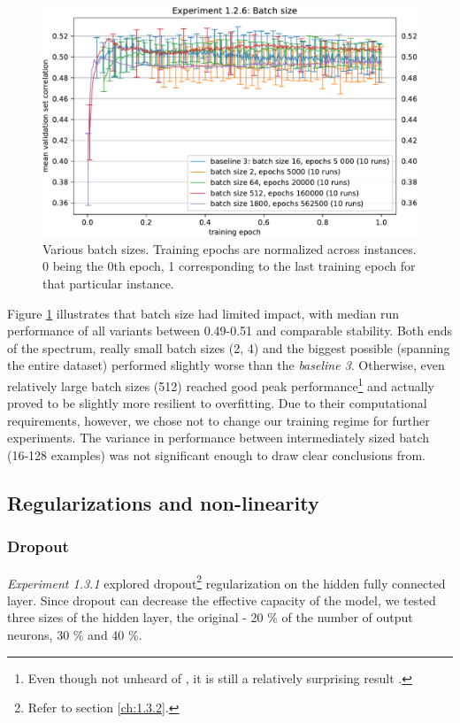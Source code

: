 \begin{figure}[H]
    \centering
    \includegraphics[width=1\textwidth]{../figures/05_1_2_6}
    \caption[Experiment 1.2.6]{Various batch sizes. Training epochs are normalized across instances. 0 being the 0th epoch, 1 corresponding to the last training epoch for that particular instance.}
    \label{fig:5.1.2.6}
\end{figure}

Figure \ref{fig:5.1.2.6} illustrates that batch size had limited impact, with median run performance of all variants between 0.49-0.51 and comparable stability. Both ends of the spectrum, really small batch sizes (2, 4) and the biggest possible (spanning the entire dataset) performed slightly worse than the \textit{baseline 3}. Otherwise, even relatively large batch sizes (512) reached good peak performance\footnote{Even though not unheard of \citep{2017arXiv171100489S}, it is still a relatively surprising result \citep{2017arXiv170508741H}.} and actually proved to be slightly more resilient to overfitting. Due to their computational requirements, however, we chose not to change our training regime for further experiments. The variance in performance between intermediately sized batch (16-128 examples) was not significant enough to draw clear conclusions from.

\subsection{Regularizations and non-linearity}
\subsubsection{Dropout}

\textit{Experiment 1.3.1} explored dropout\footnote{Refer to section \ref{ch:1.3.2}.} regularization on the hidden fully connected layer. Since dropout can decrease the effective capacity of the model, we tested three sizes of the hidden layer, the original - 20 \% of the number of output neurons, 30 \% and 40 \%. 

